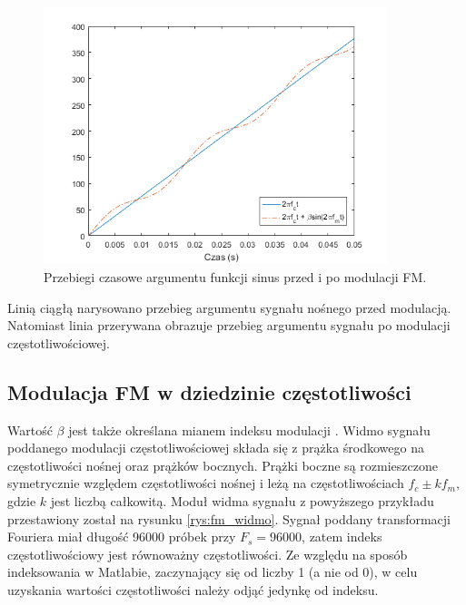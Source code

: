\begin{figure}[H]
	\centering
	\includegraphics[width=10cm]{grafiki/fm_arg}
	\captionsetup{justification=centering}
	\caption{Przebiegi czasowe argumentu funkcji sinus przed i po modulacji FM.}
	\label{rys:fm_arg}
\end{figure}
Linią ciągłą narysowano przebieg argumentu sygnału nośnego przed modulacją. Natomiast linia przerywana obrazuje przebieg argumentu sygnału po modulacji częstotliwościowej.
\subsection{Modulacja FM w dziedzinie częstotliwości}
Wartość $\beta$ jest także określana mianem indeksu modulacji \cite{chowning}. Widmo sygnału poddanego modulacji częstotliwościowej składa się z prążka środkowego na częstotliwości nośnej oraz prążków bocznych. Prążki boczne są rozmieszczone symetrycznie względem częstotliwości nośnej i leżą na częstotliwościach $f_c \pm kf_m$, gdzie $k$ jest liczbą całkowitą. Moduł widma sygnału z powyższego przykładu przestawiony został na rysunku \ref{rys:fm_widmo}. Sygnał poddany transformacji Fouriera miał długość 96000 próbek przy $F_s = 96000$, zatem indeks częstotliwościowy jest równoważny częstotliwości. Ze względu na sposób indeksowania w Matlabie, zaczynający się od liczby 1 (a nie od 0), w celu uzyskania wartości częstotliwości należy odjąć jedynkę od indeksu.

